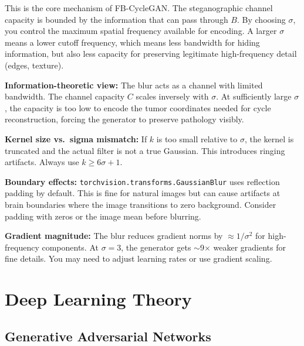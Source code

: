 \documentclass[11pt,a4paper]{article}
\theoremstyle{definition}
\begin{document}
\begin{keyinsight}
This is the core mechanism of FB-CycleGAN. The steganographic channel capacity is bounded by the information that can pass through $B$. By choosing $\sigma$, you control the maximum spatial frequency available for encoding. A larger $\sigma$ means a lower cutoff frequency, which means less bandwidth for hiding information, but also less capacity for preserving legitimate high-frequency detail (edges, texture).

\vspace{0.5em}
\textbf{Information-theoretic view:} The blur acts as a channel with limited bandwidth. The channel capacity $C$ scales inversely with $\sigma$. At sufficiently large $\sigma$, the capacity is too low to encode the tumor coordinates needed for cycle reconstruction, forcing the generator to preserve pathology visibly.
\end{keyinsight}

\begin{edgecase}
\textbf{Kernel size vs.\ sigma mismatch:} If $k$ is too small relative to $\sigma$, the kernel is truncated and the actual filter is not a true Gaussian. This introduces ringing artifacts. Always use $k \geq 6\sigma + 1$.

\vspace{0.3em}
\textbf{Boundary effects:} \texttt{torchvision.transforms.GaussianBlur} uses reflection padding by default. This is fine for natural images but can cause artifacts at brain boundaries where the image transitions to zero background. Consider padding with zeros or the image mean before blurring.

\vspace{0.3em}
\textbf{Gradient magnitude:} The blur reduces gradient norms by $\approx 1/\sigma^2$ for high-frequency components. At $\sigma = 3$, the generator gets $\sim$9$\times$ weaker gradients for fine details. You may need to adjust learning rates or use gradient scaling.
\end{edgecase}

\section{Deep Learning Theory}

\subsection{Generative Adversarial Networks}
\end{document}
